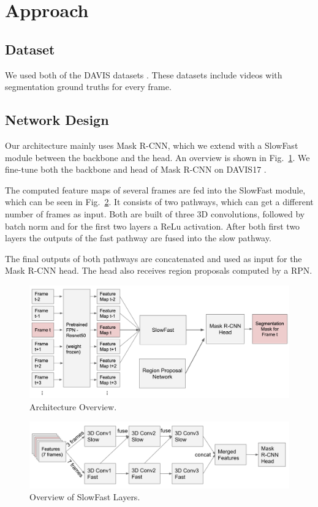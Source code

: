 \section{Approach}
\subsection{Dataset}
We used both of the DAVIS datasets \cite{davis_2016, davis_2017}. These datasets include videos with segmentation ground truths for every frame.
\subsection{Network Design}
Our architecture mainly uses Mask R-CNN, which we extend with a SlowFast module between the backbone and the head. An overview is shown in  Fig.~\ref{architecture}. We fine-tune both the backbone and head of Mask R-CNN on DAVIS17 \cite{davis_2017}.

The computed feature maps of several frames are fed into the SlowFast module, which can be seen in Fig.~\ref{slowfast}. It consists of two pathways, which can get a different number of frames as input. Both are built of three 3D convolutions, followed by batch norm and for the first two layers a ReLu activation. After both first two layers the outputs of the fast pathway are fused into the slow pathway.

The final outputs of both pathways are concatenated and used as input for the Mask R-CNN head. The head also receives region proposals computed by a RPN.

\begin{figure}
	\centering
	\includegraphics[width=\columnwidth]{figures/architecture.png}
	\caption{Architecture Overview.}
	\label{architecture}
\end{figure}

\begin{figure}
	\centering
	\includegraphics[width=\columnwidth]{figures/slowfast.png}
	\caption{Overview of SlowFast Layers.}
	\label{slowfast}
\end{figure}
